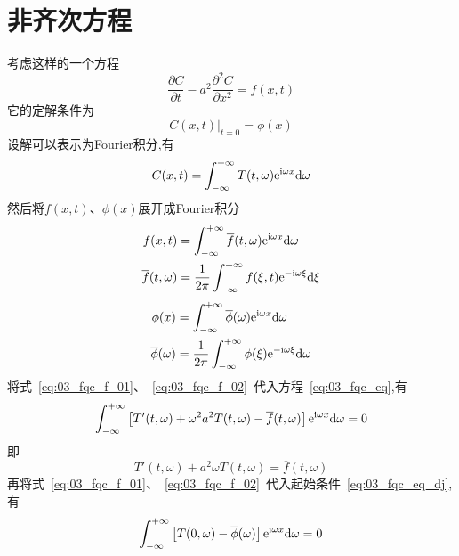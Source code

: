 \section{非齐次方程}
考虑这样的一个方程
\begin{equation}\label{eq:03_fqc_eq}
 \dfrac{\partial C}{\partial t}-a^2\dfrac{\partial^2 C}{\partial x^2}=f(x,t)
\end{equation}
它的定解条件为
\begin{equation}\label{eq:03_fqc_eq_dj}
 \left.C(x,t)\right|_{t=0}=\phi(x)
\end{equation}
设解可以表示为Fourier积分,有
\begin{equation}\label{eq:03_fqc_jie_f}
 C(x,t)=\int_{-\infty}^{+\infty}T(t,\omega)\mathrm{e}^{\mathrm{i}\omega x}\mathrm{d}\omega
\end{equation}
然后将$f(x,t)$、$\phi(x)$展开成Fourier积分
\begin{equation}\label{eq:03_fqc_f_01}
 \begin{split}
  f(x,t)&=\int_{-\infty}^{+\infty}\overline{f}(t,\omega)\mathrm{e}^{\mathrm{i}\omega x}\mathrm{d}\omega\\
  \overline{f}(t,\omega)&=\dfrac{1}{2\pi}\int_{-\infty}^{+\infty}f(\xi,t)\mathrm{e}^{-\mathrm{i}\omega\xi}\mathrm{d}\xi
 \end{split}
\end{equation}
\begin{equation}\label{eq:03_fqc_f_02}
 \begin{split}
  \phi(x)&=\int_{-\infty}^{+\infty}\overline{\phi}(\omega)\mathrm{e}^{\mathrm{i}\omega x}\mathrm{d}\omega\\
  \overline{\phi}(\omega)&=\dfrac{1}{2\pi}\int_{-\infty}^{+\infty}\phi(\xi)\mathrm{e}^{-\mathrm{i}\omega\xi}\mathrm{d}\omega
 \end{split}
\end{equation}
将式~\eqref{eq:03_fqc_f_01}、~\eqref{eq:03_fqc_f_02}~代入方程~\eqref{eq:03_fqc_eq},有
\begin{equation*}
 \int_{-\infty}^{+\infty}\left[T'(t,\omega)+\omega^2 a^2T(t,\omega)-\overline{f}(t,\omega)\right]\mathrm{e}^{\mathrm{i}\omega x}\mathrm{d}\omega=0
\end{equation*}
即
\begin{equation}\label{eq:03_fqc_f_re}
 T'(t,\omega)+a^2\omega T(t,\omega)=\overline{f}(t,\omega)
\end{equation}
再将式~\eqref{eq:03_fqc_f_01}、~\eqref{eq:03_fqc_f_02}~代入起始条件~\eqref{eq:03_fqc_eq_dj},有
\begin{equation*}
 \int_{-\infty}^{+\infty}\left[T(0,\omega)-\overline{\phi}(\omega)\right]\mathrm{e}^{\mathrm{i}\omega x}\mathrm{d}\omega=0
\end{equation*}
